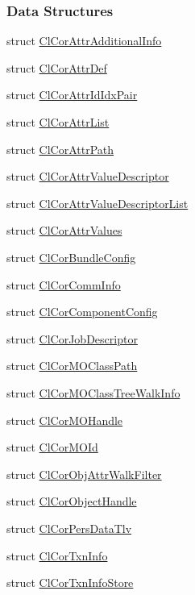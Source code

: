 \subsubsection*{Data Structures}
\begin{CompactItemize}
\item 
struct \hyperlink{struct_cl_cor_attr_additional_info}{Cl\-Cor\-Attr\-Additional\-Info}
\item 
struct \hyperlink{struct_cl_cor_attr_def}{Cl\-Cor\-Attr\-Def}
\item 
struct \hyperlink{struct_cl_cor_attr_id_idx_pair}{Cl\-Cor\-Attr\-Id\-Idx\-Pair}
\item 
struct \hyperlink{struct_cl_cor_attr_list}{Cl\-Cor\-Attr\-List}
\item 
struct \hyperlink{struct_cl_cor_attr_path}{Cl\-Cor\-Attr\-Path}
\item 
struct \hyperlink{struct_cl_cor_attr_value_descriptor}{Cl\-Cor\-Attr\-Value\-Descriptor}
\item 
struct \hyperlink{struct_cl_cor_attr_value_descriptor_list}{Cl\-Cor\-Attr\-Value\-Descriptor\-List}
\item 
struct \hyperlink{struct_cl_cor_attr_values}{Cl\-Cor\-Attr\-Values}
\item 
struct \hyperlink{struct_cl_cor_bundle_config}{Cl\-Cor\-Bundle\-Config}
\item 
struct \hyperlink{struct_cl_cor_comm_info}{Cl\-Cor\-Comm\-Info}
\item 
struct \hyperlink{struct_cl_cor_component_config}{Cl\-Cor\-Component\-Config}
\item 
struct \hyperlink{struct_cl_cor_job_descriptor}{Cl\-Cor\-Job\-Descriptor}
\item 
struct \hyperlink{struct_cl_cor_m_o_class_path}{Cl\-Cor\-MOClass\-Path}
\item 
struct \hyperlink{struct_cl_cor_m_o_class_tree_walk_info}{Cl\-Cor\-MOClass\-Tree\-Walk\-Info}
\item 
struct \hyperlink{struct_cl_cor_m_o_handle}{Cl\-Cor\-MOHandle}
\item 
struct \hyperlink{struct_cl_cor_m_o_id}{Cl\-Cor\-MOId}
\item 
struct \hyperlink{struct_cl_cor_obj_attr_walk_filter}{Cl\-Cor\-Obj\-Attr\-Walk\-Filter}
\item 
struct \hyperlink{struct_cl_cor_object_handle}{Cl\-Cor\-Object\-Handle}
\item 
struct \hyperlink{struct_cl_cor_pers_data_tlv}{Cl\-Cor\-Pers\-Data\-Tlv}
\item 
struct \hyperlink{struct_cl_cor_txn_info}{Cl\-Cor\-Txn\-Info}
\item 
struct \hyperlink{struct_cl_cor_txn_info_store}{Cl\-Cor\-Txn\-Info\-Store}
\end{CompactItemize}
